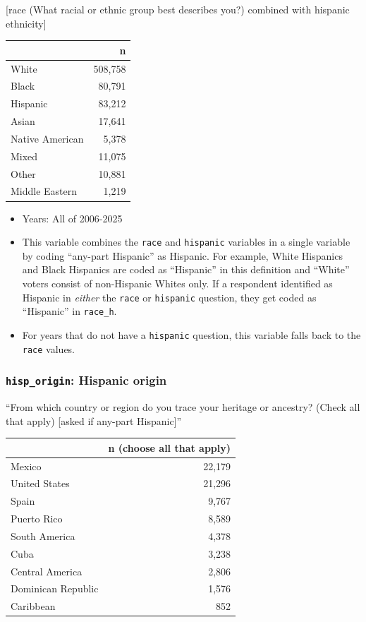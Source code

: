 \documentclass[10pt,article,oneside]{memoir}
\begin{document}
{[}race (What racial or ethnic group best describes you?) combined with
hispanic ethnicity{]}

\begin{table}[H]
\centering
\begin{tabular}[t]{lr}
\toprule
 & n\\
\midrule
White & 508,758\\
Black & 80,791\\
Hispanic & 83,212\\
Asian & 17,641\\
Native American & 5,378\\
Mixed & 11,075\\
Other & 10,881\\
Middle Eastern & 1,219\\
\bottomrule
\end{tabular}
\end{table}

\begin{itemize}
\tightlist
\item
  Years: All of 2006-2025
\item
  This variable combines the \texttt{race} and \texttt{hispanic}
  variables in a single variable by coding ``any-part Hispanic'' as
  Hispanic. For example, White Hispanics and Black Hispanics are coded
  as ``Hispanic'' in this definition and ``White'' voters consist of
  non-Hispanic Whites only. If a respondent identified as Hispanic in
  \emph{either} the \texttt{race} or \texttt{hispanic} question, they
  get coded as ``Hispanic'' in \texttt{race\_h}.
\item
  For years that do not have a \texttt{hispanic} question, this variable
  falls back to the \texttt{race} values.
\end{itemize}

\subsubsection{\texorpdfstring{\texttt{hisp\_origin}: Hispanic
origin}{hisp\_origin: Hispanic origin}}\label{hisp_origin-hispanic-origin}

``From which country or region do you trace your heritage or ancestry?
(Check all that apply) {[}asked if any-part Hispanic{]}''

\begin{table}[H]
\centering
\begin{tabular}[t]{lr}
\toprule
 & n (choose all that apply)\\
\midrule
Mexico & 22,179\\
United States & 21,296\\
Spain & 9,767\\
Puerto Rico & 8,589\\
South America & 4,378\\
Cuba & 3,238\\
Central America & 2,806\\
Dominican Republic & 1,576\\
Caribbean & 852\\
\bottomrule
\end{tabular}
\end{table}
\end{document}
